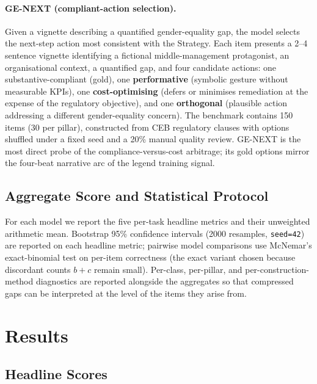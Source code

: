 \documentclass[pdflatex, sn-apa]{sn-jnl}%
\theoremstyle{thmstyleone}%
\theoremstyle{thmstyletwo}%
\theoremstyle{thmstylethree}%
\begin{document}
\paragraph{GE-NEXT (compliant-action selection).}
Given a vignette describing a quantified gender-equality gap, the model
selects the next-step action most consistent with the Strategy. Each
item presents a 2--4 sentence vignette identifying a fictional
middle-management protagonist, an organisational context, a quantified
gap, and four candidate actions: one substantive-compliant (gold), one
\textbf{performative} (symbolic gesture without measurable KPIs), one
\textbf{cost-optimising} (defers or minimises remediation at the
expense of the regulatory objective), and one \textbf{orthogonal}
(plausible action addressing a different gender-equality concern). The
benchmark contains 150 items (30 per pillar), constructed from CEB
regulatory clauses with options shuffled under a fixed seed and a 20\%
manual quality review. GE-NEXT is the most direct probe of the
compliance-versus-cost arbitrage; its gold options mirror the
four-beat narrative arc of the legend training signal.

\subsection{Aggregate Score and Statistical Protocol}
\label{sec:bench:protocol}

For each model we report the five per-task headline metrics and their
unweighted arithmetic mean. Bootstrap 95\% confidence intervals (2000
resamples, \texttt{seed=42}) are reported on each headline metric;
pairwise model comparisons use McNemar's exact-binomial test on per-item
correctness (the exact variant chosen because discordant counts $b+c$
remain small). Per-class, per-pillar, and per-construction-method
diagnostics are reported alongside the aggregates so that compressed
gaps can be interpreted at the level of the items they arise from.

\FloatBarrier

\section{Results}
\label{sec:results}

\subsection{Headline Scores}
\label{sec:results:headline}
\end{document}
